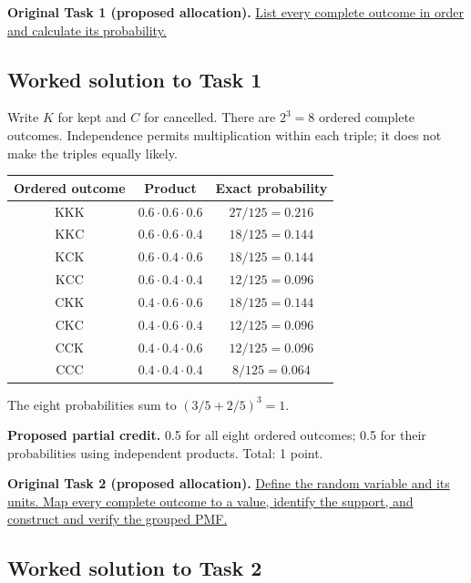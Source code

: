 \textbf{Original Task 1 (proposed allocation).} \hyperref[sol:q1t1]{List every complete outcome in order and calculate its probability.} 


\subsection*{Worked solution to Task 1 }
\label{sol:q1t1}

Write $K$ for kept and $C$ for cancelled. There are $2^3=8$ ordered complete outcomes. Independence permits multiplication within each triple; it does not make the triples equally likely.

\begin{center}
\begin{tabular}{ccc}\toprule
Ordered outcome & Product & Exact probability\\\midrule
$\mathrm{KKK}$ & $0.6\cdot0.6\cdot0.6$ & $27/125=0.216$\\
$\mathrm{KKC}$ & $0.6\cdot0.6\cdot0.4$ & $18/125=0.144$\\
$\mathrm{KCK}$ & $0.6\cdot0.4\cdot0.6$ & $18/125=0.144$\\
$\mathrm{KCC}$ & $0.6\cdot0.4\cdot0.4$ & $12/125=0.096$\\
$\mathrm{CKK}$ & $0.4\cdot0.6\cdot0.6$ & $18/125=0.144$\\
$\mathrm{CKC}$ & $0.4\cdot0.6\cdot0.4$ & $12/125=0.096$\\
$\mathrm{CCK}$ & $0.4\cdot0.4\cdot0.6$ & $12/125=0.096$\\
$\mathrm{CCC}$ & $0.4\cdot0.4\cdot0.4$ & $8/125=0.064$\\
\bottomrule\end{tabular}
\end{center}


The eight probabilities sum to $(3/5+2/5)^3=1$.

\textbf{Proposed partial credit.} 0.5 for all eight ordered outcomes; 0.5 for their probabilities using independent products. Total: 1 point.

\par\vspace{3mm}\secInicio[][sec:q1]

\textbf{Original Task 2 (proposed allocation).} \hyperref[sol:q1t2]{Define the random variable and its units. Map every complete outcome to a value, identify the support, and construct and verify the grouped PMF.} 


\subsection*{Worked solution to Task 2 }
\label{sol:q1t2}

